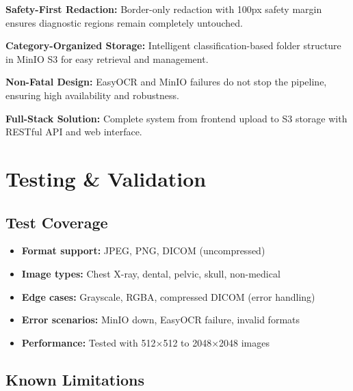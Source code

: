 \documentclass[12pt,a4paper]{article}
\begin{document}
\begin{tcolorbox}[colback=gray!10,colframe=black]
\textbf{Safety-First Redaction:} Border-only redaction with 100px safety margin ensures diagnostic regions remain completely untouched.
\end{tcolorbox}

\begin{tcolorbox}[colback=gray!10,colframe=black]
\textbf{Category-Organized Storage:} Intelligent classification-based folder structure in MinIO S3 for easy retrieval and management.
\end{tcolorbox}

\begin{tcolorbox}[colback=gray!10,colframe=black]
\textbf{Non-Fatal Design:} EasyOCR and MinIO failures do not stop the pipeline, ensuring high availability and robustness.
\end{tcolorbox}

\begin{tcolorbox}[colback=gray!10,colframe=black]
\textbf{Full-Stack Solution:} Complete system from frontend upload to S3 storage with RESTful API and web interface.
\end{tcolorbox}

\section{Testing \& Validation}

\subsection{Test Coverage}

\begin{itemize}[leftmargin=1.2cm]
    \item \textbf{Format support:} JPEG, PNG, DICOM (uncompressed)
    \item \textbf{Image types:} Chest X-ray, dental, pelvic, skull, non-medical
    \item \textbf{Edge cases:} Grayscale, RGBA, compressed DICOM (error handling)
    \item \textbf{Error scenarios:} MinIO down, EasyOCR failure, invalid formats
    \item \textbf{Performance:} Tested with 512×512 to 2048×2048 images
\end{itemize}

\subsection{Known Limitations}
\end{document}
